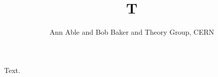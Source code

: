\documentclass{article}
\begin{document}
\title{T}
\author{Ann Able and Bob Baker and Theory Group, CERN}
\maketitle
Text.
\end{document}
